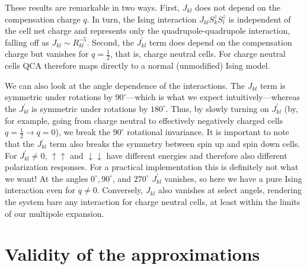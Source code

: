 These results are remarkable in two ways. First, $J_{kl}$ does not depend on the
compensation charge $q$. In turn, the Ising interaction $J_{kl}
S^z_k S^z_l$ is independent of the cell net charge and represents only
the quadrupole-quadrupole interaction, falling off as $J_{kl} \sim R_{kl}^{-5}$.
Second, the $J^{\prime}_{kl}$ term does depend on the compensation charge but
vanishes for $q = \frac{1}{2}$, that is, charge neutral cells. For charge
neutral cells QCA therefore maps directly to a normal (unmodified) Ising model.

We can also look at the angle dependence of the interactions. The $J_{kl}$ term is
symmetric under rotations by $90^{\circ}$---which is what we expect
intuitively---whereas the $J^{\prime}_{kl}$ is symmetric under rotations by
$180^{\circ}$. Thus, by slowly turning on $J^{\prime}_{kl}$ (by, for example, going
from charge neutral to effectively negatively charged cells $q = \frac{1}{2}
\rightarrow q = 0$), we break the $90^{\circ}$ rotational invariance. It is
important to note that the $J^{\prime}_{kl}$ term also breaks the symmetry between
spin up and spin down cells. For $J^{\prime}_{kl} \ne 0$, $\uparrow\uparrow$ and
$\downarrow\downarrow$ have different energies and therefore also different
polarization responses. For a practical implementation this is definitely not
what we want! At the angles $0^{\circ}, 90^{\circ}$, and $270^{\circ}$
$J^{\prime}_{kl}$ vanishes, so here we have a pure Ising interaction even for $q
\ne 0$. Conversely, $J_{kl}$ also vanishes at select angels, rendering the system
bare any interaction for charge neutral cells, at least within the limits of our
multipole expansion.



\section{Validity of the approximations}



